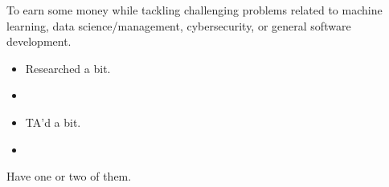 \documentclass[11pt]{resume}
\begin{document}

    \begin{fullwidth}
    \makeheader
    \end{fullwidth}
    
    \sffamily

    To earn some money while tackling challenging problems related to machine learning, data science/management, 
    cybersecurity, or general software development.

    
    
    \begin{itemize}
        \item Researched a bit.
        \item
    \end{itemize}
        
    
    \begin{itemize}
        \item TA'd a bit.
        \item
    \end{itemize}
    

    Have one or two of them.
\end{document}
